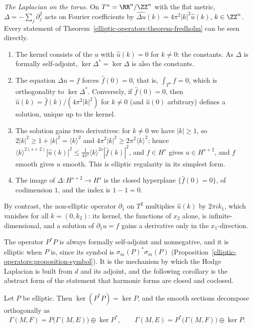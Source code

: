 \begin{example}\label{elliptic-operators:example-fredholm-torus}
\emph{The Laplacian on the torus.} On $T^n = \RR^n/\ZZ^n$ with the flat metric, $\Delta = -\sum_j\partial_j^2$ acts on Fourier coefficients by $\widehat{\Delta u}(k) = 4\pi^2|k|^2\hat u(k)$, $k \in \ZZ^n$. Every statement of
Theorem~\ref{elliptic-operators:theorem-fredholm} can be seen directly.
\begin{enumerate}
\item The kernel consists of the $u$ with $\hat u(k) = 0$ for $k \neq 0$: the constants. As $\Delta$ is formally self-adjoint, $\ker\Delta^* = \ker\Delta$ is also the constants.
\item The equation $\Delta u = f$ forces $\hat f(0) = 0$, that is, $\int_{T^n}f = 0$, which is orthogonality to $\ker\Delta^*$. Conversely, if $\hat f(0) = 0$, then $\hat u(k) = \hat f(k)/(4\pi^2|k|^2)$ for $k \neq 0$ (and
$\hat u(0)$ arbitrary) defines a solution, unique up to the kernel.
\item The solution gains two derivatives: for $k \neq 0$ we have $|k| \geq 1$, so $2|k|^2 \geq 1 + |k|^2 = \langle k\rangle^2$ and $4\pi^2|k|^2 \geq 2\pi^2\langle k\rangle^2$; hence
$\langle k\rangle^{2(s+2)}|\hat u(k)|^2 \leq \frac{1}{4\pi^4}\langle k\rangle^{2s}|\hat f(k)|^2$, and $f \in H^s$ gives
$u \in H^{s+2}$, and $f$ smooth gives $u$ smooth. This is elliptic regularity in its simplest form.
\item The image of $\Delta \colon H^{s+2} \to H^s$ is the closed hyperplane $\{\hat f(0) = 0\}$, of codimension $1$, and the index is $1 - 1 = 0$.
\end{enumerate}
By contrast, the non-elliptic operator $\partial_1$ on $T^2$ multiplies $\hat u(k)$ by $2\pi ik_1$, which vanishes for all $k = (0, k_2)$: its kernel, the functions of $x_2$ alone, is infinite-dimensional, and a solution of
$\partial_1u = f$ gains a derivative only in the $x_1$-direction.
\end{example}

The operator $P^*P$ is always formally self-adjoint and nonnegative, and it is elliptic when $P$ is, since its symbol is $\sigma_m(P)^*\sigma_m(P)$ (Proposition~\ref{elliptic-operators:proposition-symbol}). It is the
mechanism by which the Hodge Laplacian is built from $d$ and its adjoint, and the following corollary is the abstract form of the statement that harmonic forms are closed and coclosed.

\begin{corollary}\label{elliptic-operators:corollary-p-star-p}
Let $P$ be elliptic. Then $\ker(P^*P) = \ker P$, and the smooth sections decompose orthogonally as
\[
\Gamma(M, F) = P\bigl(\Gamma(M, E)\bigr) \oplus \ker P^*, \qquad \Gamma(M, E) = P^*\bigl(\Gamma(M, F)\bigr) \oplus \ker P.
\]
\end{corollary}

